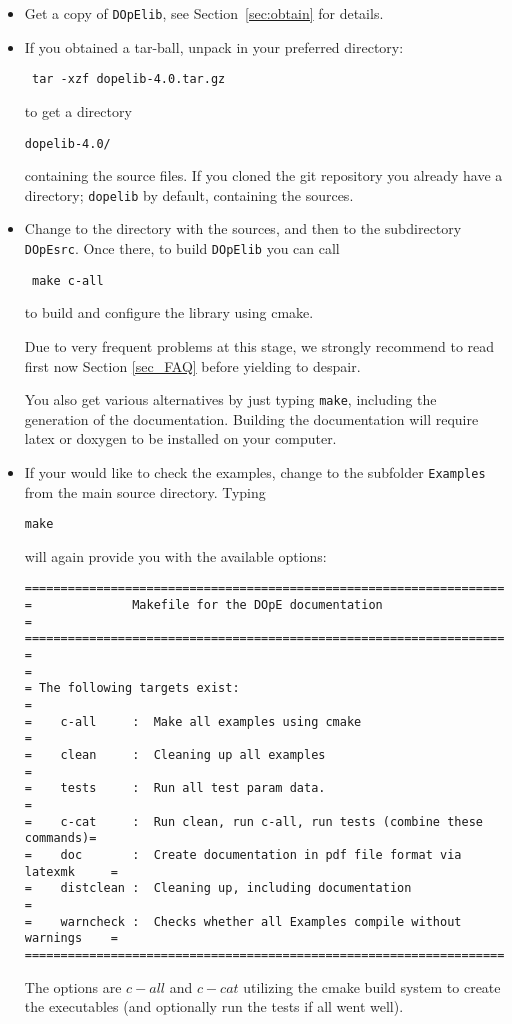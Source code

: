\begin{itemize}
%
\item Get a copy of \texttt{DOpElib}, see Section~\ref{sec:obtain} for details.
%
\item If you obtained a tar-ball, unpack in your preferred directory:
\begin{lstlisting}
 tar -xzf dopelib-4.0.tar.gz
\end{lstlisting}
to get a directory 
\begin{lstlisting}
dopelib-4.0/
\end{lstlisting}
containing the source files. If you cloned the git repository you
already have a directory; \texttt{dopelib} by default, containing the sources.
\item Change to the directory with the sources, and then to the
  subdirectory \texttt{DOpEsrc}.
Once there, to build \texttt{DOpElib} you can call 
\begin{lstlisting}
 make c-all
\end{lstlisting}
to build and configure the library using cmake. 
\begin{remark}
Due to very frequent problems at this stage, we strongly recommend 
to read first now Section \ref{sec_FAQ} before yielding to despair.
\end{remark}



You also get various alternatives by just typing 
\texttt{make}, including the generation of the documentation.
Building the documentation will require  
latex or doxygen to be installed on your computer.
\item If your would like to check the examples, change to the
  subfolder \texttt{Examples} from the main source directory.
Typing 
\begin{lstlisting}
make
\end{lstlisting}
will again provide you with the available options:
{\footnotesize
\begin{lstlisting}
===========================================================================
=              Makefile for the DOpE documentation                        =
===========================================================================
=                                                                         =
= The following targets exist:                                            =
=    c-all     :  Make all examples using cmake                           =
=    clean     :  Cleaning up all examples                                =
=    tests     :  Run all test param data.                                =
=    c-cat     :  Run clean, run c-all, run tests (combine these commands)=
=    doc       :  Create documentation in pdf file format via latexmk     =
=    distclean :  Cleaning up, including documentation                    =
=    warncheck :  Checks whether all Examples compile without warnings    =
===========================================================================
\end{lstlisting}
}
The options are $c-all$ and $c-cat$ utilizing the cmake build system
to create the executables (and optionally run the tests if all went well).


\end{itemize}
